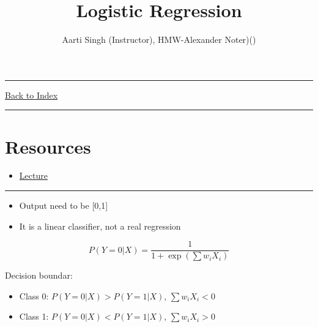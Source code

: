\documentclass[letterpaper,10pt]{article}
\title{\textbf{Logistic Regression}}
\author{Aarti Singh (Instructor), HMW-Alexander Noter)()}
\newcommand{\panhline}{\begin{center}\rule{\textwidth}{1pt}\end{center}}
\begin{document}
\maketitle

\panhline
\href{../index.html}{Back to Index}

\panhline
\tableofcontents

\section*{Resources}

\begin{itemize}
	\item \href{../../Lectures/05_LinearLogisticRegression.pdf}{Lecture}
\end{itemize}

\panhline

\begin{itemize}
	\item Output need to be [0,1]
	\item It is a linear classifier, not a real regression
\end{itemize}
	
$$P(Y=0|X)=\frac{1}{1+\exp(\sum{w_iX_i})}$$

Decision boundar:
\begin{itemize}
	\item Class 0: $P(Y=0|X)>P(Y=1|X)$, $\sum{w_iX_i}<0$
	\item Class 1: $P(Y=0|X)<P(Y=1|X)$, $\sum{w_iX_i}>0$
\end{itemize}
\end{document}

